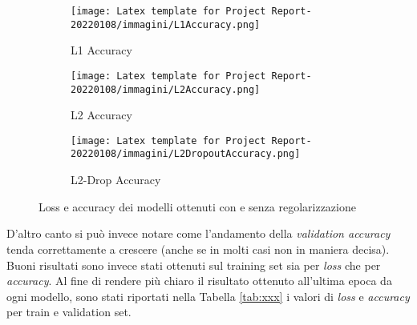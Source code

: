 \begin{figure}[h!]
     \begin{subfigure}[b]{0.32\textwidth}
         \centering
         \texttt{[image: Latex template for Project Report-20220108/immagini/L1Accuracy.png]}
         \caption{L1 Accuracy}
         \label{fig:L1Acc}
     \end{subfigure}
     \hfill
     \begin{subfigure}[b]{0.32\textwidth}
         \centering
         \texttt{[image: Latex template for Project Report-20220108/immagini/L2Accuracy.png]}
         \caption{L2 Accuracy}
         \label{fig:L2Acc}
     \end{subfigure}
     \hfill
     \begin{subfigure}[b]{0.32\textwidth}
         \centering
         \texttt{[image: Latex template for Project Report-20220108/immagini/L2DropoutAccuracy.png]}
         \caption{L2-Drop Accuracy}
         \label{fig:L2DropAcc}
     \end{subfigure}

     \caption{Loss e accuracy dei modelli ottenuti con e senza regolarizzazione}
     \label{fig:primiModelli}
\end{figure}
D'altro canto si può invece notare come l'andamento della \textit{validation accuracy} tenda correttamente a crescere (anche se in molti casi non in maniera decisa). Buoni risultati sono invece stati ottenuti sul training set sia per \textit{loss} che per \textit{accuracy}. Al fine di rendere più chiaro il risultato ottenuto all'ultima epoca da ogni modello, sono stati riportati nella Tabella \ref{tab:xxx} i valori di \textit{loss} e \textit{accuracy} per train e validation set.

